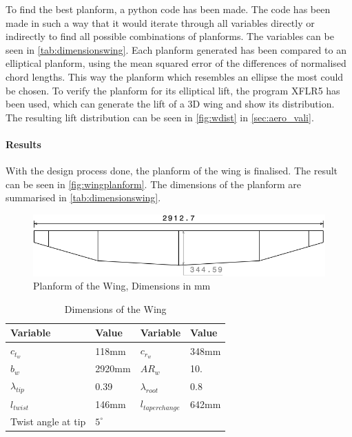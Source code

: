 To find the best planform, a python code has been made. The code has been made in such a way that it would iterate through all variables directly or indirectly to find all possible combinations of planforms. The variables can be seen in \autoref{tab:dimensionswing}. Each planform generated has been compared to an elliptical planform, using the mean squared error of the differences of normalised chord lengths. This way the planform which resembles an ellipse the most could be chosen. To verify the planform for its elliptical lift, the program XFLR5 has been used, which can generate the lift of a 3D wing and show its distribution. The resulting lift distribution can be seen in \autoref{fig:wdist} in \autoref{sec:aero_vali}.

\paragraph{Results}

With the design process done, the planform of the wing is finalised. The result can be seen in \autoref{fig:wingplanform}. The dimensions of the planform are summarised in \autoref{tab:dimensionswing}.

\begin{figure}[H]
    \centering
    \includegraphics[scale=0.75]{Aerodynamics/Figures/wingplanform}
    \caption{Planform of the Wing, Dimensions in mm}
    \label{fig:wingplanform}
\end{figure}

\begin{table}[H]
    \centering
    \caption{Dimensions of the Wing}
    \label{tab:dimensionswing}
    \begin{tabular}{llll}\toprule
\bfseries    Variable     &\bfseries  Value &\bfseries Variable &\bfseries Value\\ \midrule
    $c_{t_w}$     & 118mm & $c_{r_w}$ & 348mm\\
    $b_w$ & 2920mm & $AR_w$ & 10. \\
    $\lambda_{tip}$ & 0.39 & $\lambda_{root}$ & 0.8 \\
    $l_{twist}$ & 146mm & $l_{taperchange}$ & 642mm \\
    Twist angle at tip & $5^{\circ}$ & &\\ \bottomrule
    \end{tabular}
\end{table}



